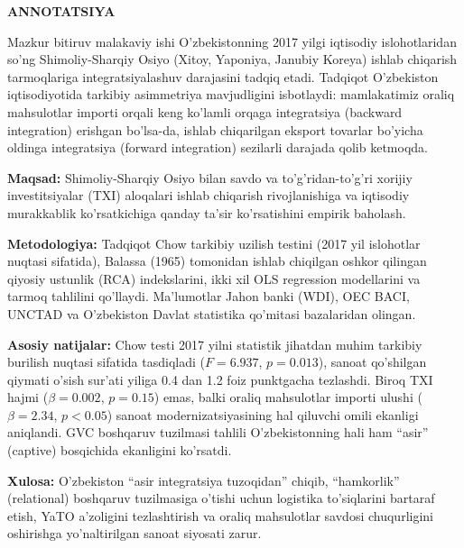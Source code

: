 
\newpage
\thispagestyle{plain}
\begin{center}
 {\large\bfseries ANNOTATSIYA}
\end{center}

\vspace{0.5em}
\noindent
Mazkur bitiruv malakaviy ishi O'zbekistonning 2017 yilgi iqtisodiy islohotlaridan so'ng Shimoliy-Sharqiy Osiyo (Xitoy, Yaponiya, Janubiy Koreya) ishlab chiqarish tarmoqlariga integratsiyalashuv darajasini tadqiq etadi. Tadqiqot O'zbekiston iqtisodiyotida tarkibiy asimmetriya mavjudligini isbotlaydi: mamlakatimiz oraliq mahsulotlar importi orqali keng ko'lamli orqaga integratsiya (backward integration) erishgan bo'lsa-da, ishlab chiqarilgan eksport tovarlar bo'yicha oldinga integratsiya (forward integration) sezilarli darajada qolib ketmoqda.

\textbf{Maqsad:} Shimoliy-Sharqiy Osiyo bilan savdo va to'g'ridan-to'g'ri xorijiy investitsiyalar (TXI) aloqalari ishlab chiqarish rivojlanishiga va iqtisodiy murakkablik ko'rsatkichiga qanday ta'sir ko'rsatishini empirik baholash.

\textbf{Metodologiya:} Tadqiqot Chow tarkibiy uzilish testini (2017 yil islohotlar nuqtasi sifatida), Balassa (1965) tomonidan ishlab chiqilgan oshkor qilingan qiyosiy ustunlik (RCA) indekslarini, ikki xil OLS regression modellarini va tarmoq tahlilini qo'llaydi. Ma'lumotlar Jahon banki (WDI), OEC BACI, UNCTAD va O'zbekiston Davlat statistika qo'mitasi bazalaridan olingan.

\textbf{Asosiy natijalar:} Chow testi 2017 yilni statistik jihatdan muhim tarkibiy burilish nuqtasi sifatida tasdiqladi ($F=6.937$, $p=0.013$), sanoat qo'shilgan qiymati o'sish sur'ati yiliga 0.4 dan 1.2 foiz punktgacha tezlashdi. Biroq TXI hajmi ($ \beta=0.002$, $p=0.15$) emas, balki oraliq mahsulotlar importi ulushi ($\beta=2.34$, $p<0.05$) sanoat modernizatsiyasining hal qiluvchi omili ekanligi aniqlandi. GVC boshqaruv tuzilmasi tahlili O'zbekistonning hali ham ``asir'' (captive) bosqichida ekanligini ko'rsatdi.

\textbf{Xulosa:} O'zbekiston ``asir integratsiya tuzoqidan'' chiqib, ``hamkorlik'' (relational) boshqaruv tuzilmasiga o'tishi uchun logistika to'siqlarini bartaraf etish, YaTO a'zoligini tezlashtirish va oraliq mahsulotlar savdosi chuqurligini oshirishga yo'naltirilgan sanoat siyosati zarur.

